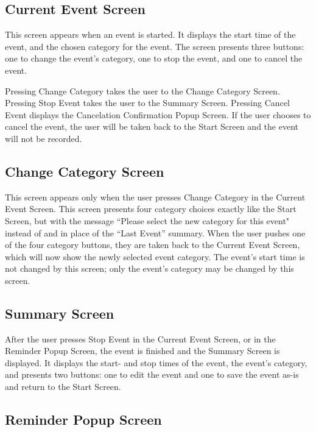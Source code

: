 \documentclass[11pt]{article}
\newcommand{\bt}[1]{{\sc #1}}
\begin{document}
\subsection{Current Event Screen}

This screen appears when an event is started. It displays the start time of the event, and the chosen category for the event. The screen presents three buttons: one to change the event's category, one to stop the event, and one to cancel the event.

Pressing \bt{Change Category} takes the user to the Change Category Screen. Pressing \bt{Stop Event} takes the user to the Summary Screen. Pressing \bt{Cancel Event} displays the Cancelation Confirmation Popup Screen. If the user chooses to cancel the event, the user will be taken back to the Start Screen and the event will not be recorded.

\subsection{Change Category Screen}

This screen appears only when the user presses \bt{Change Category} in the Current Event Screen. This screen presents four category choices exactly like the Start Screen, but with the message ``Please select the new category for this event" instead of and in place of the ``Last Event'' summary. When the user pushes one of the four category buttons, they are taken back to the Current Event Screen, which will now show the newly selected event category. The event's start time is not changed by this screen; only the event's category may be changed by this screen.

\subsection{Summary Screen}

After the user presses \bt{Stop Event} in the Current Event Screen, or in the Reminder Popup Screen, the event is finished and the Summary Screen is displayed. It displays the start- and stop times of the event, the event's category, and presents two buttons: one to edit the event and one to save the event as-is and return to the Start Screen.

\subsection{Reminder Popup Screen}
\end{document}
